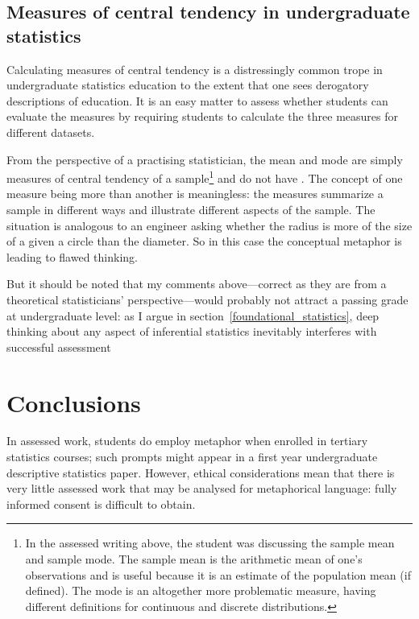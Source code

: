 \subsection{Measures of central tendency in undergraduate statistics}

Calculating measures of central tendency is a distressingly common
trope in undergraduate statistics education to the extent that one
sees derogatory descriptions of  education.
It is an easy matter to assess whether students can evaluate the
measures by requiring students to calculate the three measures for
different datasets.

From the perspective of a practising statistician, the mean and mode
are simply measures of central tendency of a sample\footnote{In the
  assessed writing above, the student was discussing the sample mean
  and sample mode.  The sample mean is the arithmetic mean of one's
  observations and is useful because it is an estimate of the
  population mean (if defined).  The mode is an altogether more
  problematic measure, having different definitions for continuous and
  discrete distributions.} and do not have .  The
concept of one measure being more  than
another is meaningless: the measures summarize a sample in different
ways and illustrate different aspects of the sample.  The situation is
analogous to an engineer asking whether the radius is more
 of the size of a given a circle than the
diameter.  So in this case the conceptual metaphor  is leading to flawed thinking.

But it should be noted that my comments above---correct as they are
from a theoretical statisticians' perspective---would probably not
attract a passing grade at undergraduate level: as I argue in
section~\ref{foundational_statistics}, deep thinking about any aspect
of inferential statistics inevitably interferes with successful
assessment

\section{Conclusions}

In assessed work, students do employ metaphor when enrolled in
tertiary statistics courses; such prompts might appear in a first year
undergraduate descriptive statistics paper.  However, ethical
considerations mean that there is very little assessed work that may
be analysed for metaphorical language: fully informed consent is
difficult to obtain.

